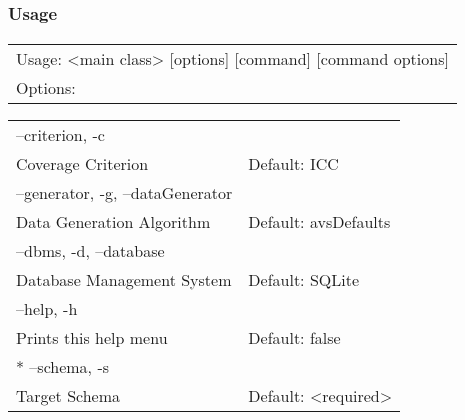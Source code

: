  \begin{frame}%
        \frametitle{Usage}
        \framesubtitle{\mbox{}}
        \centering
	\begin{tabular}{l}
		\hspace{-1em} Usage: <main class> [options] [command] [command options] \\
  Options: \\
  \end{tabular}
  \begin{tabular}{ll}
   \hspace{1em} --criterion, -c\\
     \hspace{2em}  Coverage Criterion & Default: ICC\\
   \hspace{1em} --generator, -g, --dataGenerator\\
     \hspace{2em}  Data Generation Algorithm & Default: avsDefaults\\
  \hspace{1em}  --dbms, -d, --database\\
  \hspace{2em}    Database Management System & Default: SQLite\\
   \hspace{1em} --help, -h\\
   \hspace{2em}    Prints this help menu & Default: false\\
\hspace{1em}  * --schema, -s\\
\hspace{2em}     Target Schema & Default: <required>
	\end{tabular}
\end{frame}
